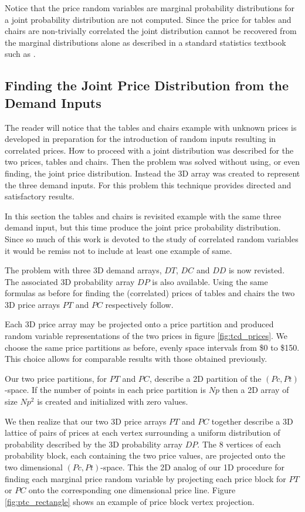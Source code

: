 Notice that the price random variables are marginal probability distributions for a joint probability distribution are not computed. Since the price for tables and chairs are non-trivially correlated the joint distribution cannot be recovered from the marginal distributions alone as described in a standard statistics textbook such as \cite{bickel01}. 

\subsection{Finding the Joint Price Distribution from the Demand Inputs}

The reader will notice that the tables and chairs example with unknown prices is developed in preparation for the introduction of random inputs resulting in correlated prices. How to proceed with a joint distribution was described for the two prices, tables and chairs. Then the problem was solved without using, or even finding, the joint price distribution. Instead the 3D array was created to represent the three demand inputs. For this problem this technique provides directed and satisfactory results.

In this section the tables and chairs is revisited example with the same three demand input, but this time produce the joint price probability distribution. Since so much of this work is devoted to the study of correlated random variables it would be remiss not to include at least one example of same.

The problem with three 3D demand arrays, $DT$, $DC$ and  $DD$ is now revisted. The associated 3D probability array $DP$ is also available. Using the same formulas as before for finding the (correlated) prices of tables and chairs the two 3D price arrays $PT$ and $PC$ respectively follow. 

Each 3D price array may be projected onto a price partition and produced random variable representations of the two prices in figure \ref{fig:tcd_prices}. We choose the same price partitions as before, evenly space intervals from \$0 to \$150. This choice allows for comparable results with those obtained previously.

Our two price partitions, for $PT$ and $PC$, describe a 2D partition of the $(Pc,Pt)$-space. If the number of points in each price partition is $Np$ then a 2D array of size $Np^2$ is created and initialized with zero values.

We then realize that our two 3D price arrays $PT$ and $PC$ together describe a 3D lattice of pairs of prices at each vertex surrounding a uniform distribution of probability described by the 3D probability array $DP$. The 8 vertices of each probability block, each containing the two price values, are projected onto the two dimensional $(Pc, Pt)$-space. This the 2D analog of our 1D procedure for finding each marginal price random variable by projecting each price block for $PT$ or $PC$ onto the corresponding one dimensional price line. Figure \ref{fig:ptc_rectangle} shows an example of price block vertex projection. 

